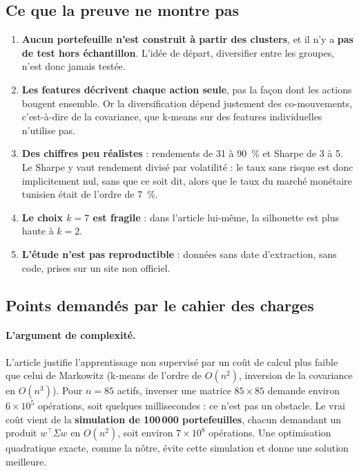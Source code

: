 \documentclass[11pt,a4paper]{article}
\newcommand{\pc}{~\%}
\begin{document}
\subsection{Ce que la preuve ne montre pas}
\begin{enumerate}
  \item \textbf{Aucun portefeuille n'est construit à partir des clusters}, et il n'y a \textbf{pas de test hors échantillon}. L'idée de départ, diversifier entre les groupes, n'est donc jamais testée.
  \item \textbf{Les features décrivent chaque action seule}, pas la façon dont les actions bougent ensemble. Or la diversification dépend justement des co-mouvements, c'est-à-dire de la covariance, que k-means sur des features individuelles n'utilise pas.
  \item \textbf{Des chiffres peu réalistes} : rendements de 31 à 90\pc{} et Sharpe de 3 à 5. Le Sharpe y vaut rendement divisé par volatilité : le taux sans risque est donc implicitement nul, sans que ce soit dit, alors que le taux du marché monétaire tunisien était de l'ordre de 7\pc{}.
  \item \textbf{Le choix $k = 7$ est fragile} : dans l'article lui-même, la silhouette est plus haute à $k = 2$.
  \item \textbf{L'étude n'est pas reproductible} : données sans date d'extraction, sans code, prises sur un site non officiel.
\end{enumerate}

\subsection{Points demandés par le cahier des charges}
\paragraph{L'argument de complexité.} L'article justifie l'apprentissage non supervisé par un coût de calcul plus faible que celui de Markowitz (k-means de l'ordre de $O(n^2)$, inversion de la covariance en $O(n^3)$). Pour $n = 85$ actifs, inverser une matrice $85 \times 85$ demande environ $6 \times 10^5$ opérations, soit quelques millisecondes : ce n'est pas un obstacle. Le vrai coût vient de la \textbf{simulation de 100\,000 portefeuilles}, chacun demandant un produit $w^\top \Sigma w$ en $O(n^2)$, soit environ $7 \times 10^8$ opérations. Une optimisation quadratique exacte, comme la nôtre, évite cette simulation et donne une solution meilleure.
\end{document}
